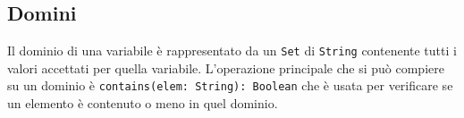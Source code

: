 \subsection{Domini}
Il dominio di una variabile è rappresentato da un \texttt{Set} di
\texttt{String} contenente tutti i valori accettati per quella
variabile.  L'operazione principale che si può compiere su un dominio
è \texttt{contains(elem: String): Boolean} che è usata per verificare
se un elemento è contenuto o meno in quel dominio.
